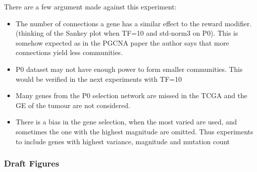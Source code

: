 There are a few argument made against this experiment:
\begin{itemize}
    \item The number of connections a gene has a similar effect to the reward modifier. (thinking of the Sankey plot when TF=10 and std-norm3 on P0). This is somehow expected as in the PGCNA paper the author says that more connections yield less communities.
    \item P0 dataset may not have enough power to form smaller communities. This would be verified in the next experiments with TF=10
    \item Many genes from the P0 selection network are missed in the TCGA and the GE of the tumour are not considered.
    \item There is a bias in the gene selection, when the most varied are used, and sometimes the one with the highest magnitude are omitted. Thus experiments to include genes with highest variance, magnitude and mutation count
\end{itemize}


\subsubsection{Draft Figures}

